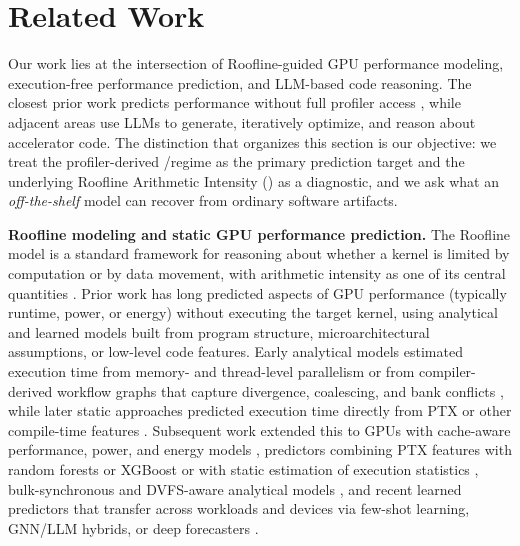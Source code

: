 \section{Related Work}
\label{sec:related-work}

Our work lies at the intersection of Roofline-guided GPU performance modeling, execution-free performance prediction, and LLM-based code reasoning.
The closest prior work predicts performance without full profiler access \cite{nguyen-nhatLLMPerfGPUPerformance2024,boletCanLargeLanguage2025,wangOmniwisePredictingGPU2025}, while adjacent areas use LLMs to generate, iteratively optimize, and reason about accelerator code.
The distinction that organizes this section is our objective: we treat the profiler-derived \bandwidthbound/\computebound regime as the primary prediction target and the underlying Roofline Arithmetic Intensity (\rai) as a diagnostic, and we ask what an \emph{off-the-shelf} model can recover from ordinary software artifacts.

\noindent\textbf{Roofline modeling and static GPU performance prediction.}
The Roofline model is a standard framework for reasoning about whether a kernel is limited by computation or by data movement, with arithmetic intensity as one of its central quantities \cite{samuelwilliamsRooflineInsightfulVisual2009}.
Prior work has long predicted aspects of GPU performance (typically runtime, power, or energy) without executing the target kernel, using analytical and learned models built from program structure, microarchitectural assumptions, or low-level code features.
Early analytical models estimated execution time from memory- and thread-level parallelism or from compiler-derived workflow graphs that capture divergence, coalescing, and bank conflicts \cite{hongAnalyticalModelGPU2009,baghsorkhiAdaptivePerformanceModeling2010}, while later static approaches predicted execution time directly from PTX or other compile-time features \cite{limAutotuningGPUKernels2017,alavaniPredictingExecutionTime2018,guerreiroGPUStaticModeling2019a}.
Subsequent work extended this to GPUs with cache-aware performance, power, and energy models \cite{lopesExploringGPUPerformance2017}, predictors combining PTX features with random forests or XGBoost or with static estimation of execution statistics \cite{braunSimpleModelPortable2021,emondsCUDAsapStaticallyDeterminedExecution2023,tranAccurateLatencyPredictor2025}, bulk-synchronous and DVFS-aware analytical models \cite{amarisComparisonGPUExecution2016,wangGPGPUPerformanceEstimation2020,leeGCoMDetailedGPU2022}, and recent learned predictors that transfer across workloads and devices via few-shot learning, GNN/LLM hybrids, or deep forecasters \cite{deyRelativePerformancePrediction2024,leeForecastingGPUPerformance2025,selvamCanLLMsEnhance2024,pannerselvamPerformancePredictionModels2025}.

